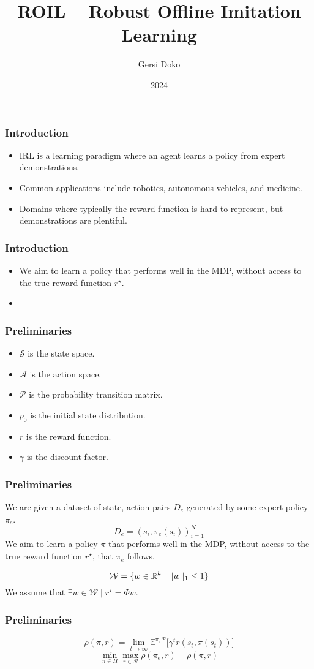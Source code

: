 \documentclass{beamer}
\title{ROIL -- Robust Offline Imitation Learning}
\author{Gersi Doko}
\institute{Dept. of Computer Science, University of New Hampshire}
\date{2024}
\begin{document}
\frame{\titlepage}

\begin{frame}
\frametitle{Introduction}
	\begin{itemize}
		\item IRL is a learning paradigm where an agent learns a policy from expert demonstrations.
		\item Common applications include robotics, autonomous vehicles, and medicine.
		\item Domains where typically the reward function is hard to represent, but demonstrations are plentiful.
	\end{itemize}
\end{frame}

\begin{frame}
	\frametitle{Introduction}
	\begin{itemize}
		\item We aim to learn a policy that performs well in the MDP, without access to the true reward function $r^\star$.
		\item 
	\end{itemize}
\end{frame}

\begin{frame}
	\frametitle{Preliminaries}
	\begin{itemize}
		\item $\mathcal{S}$ is the state space.
		\item $\mathcal{A}$ is the action space.
		\item $\mathcal{P}$ is the probability transition matrix.
		\item $p_0$ is the initial state distribution.
		\item $r$ is the reward function.
		\item $\gamma$ is the discount factor.
	\end{itemize}
\end{frame}

\begin{frame}
	\frametitle{Preliminaries}

	We are given a dataset of state, action pairs $D_e$ generated by some expert policy $\pi_e$.
	\[ D_e = (s_i, \pi_e(s_i))_{i=1}^N \]
	We aim to learn a policy $\pi$ that performs well in the MDP, without access to the true reward function $r^\star$,
	that $\pi_e$ follows.

	\[ \mathcal{W} = \lbrace w \in \mathbb{R}^k \mid \lvert \lvert w \rvert \rvert_1 \leq 1 \rbrace \]
	We assume that $\exists w \in \mathcal{W} \mid r^\star = \Phi w$.

\end{frame}

\begin{frame}
	\frametitle{Preliminaries}
	\[ \rho(\pi, r) = \lim_{t \to \infty} \mathbb{E}^{\pi, \mathcal{P}} \lbrack \gamma^t r(s_t, \pi(s_t)) \rbrack \]
	\[ \min_{\pi \in \Pi} \max_{r \in \mathcal{R}} \rho(\pi_e, r) - \rho(\pi, r)\]
\end{frame}
\end{document}
